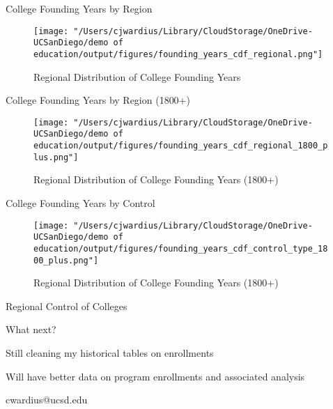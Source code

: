 \documentclass[notes,11pt, aspectratio=169]{beamer}
\newenvironment{wideitemize}{\itemize\addtolength{\itemsep}{10pt}}{\enditemize}
\begin{document}
\begin{frame}{College Founding Years by Region}
    \begin{figure}
        \centering
        \texttt{[image: "/Users/cjwardius/Library/CloudStorage/OneDrive-UCSanDiego/demo of education/output/figures/founding\_years\_cdf\_regional.png"]}
        \caption{Regional Distribution of College Founding Years}
    \end{figure}
\end{frame}

\begin{frame}{College Founding Years by Region (1800+)}
    \begin{figure}
        \centering
        \texttt{[image: "/Users/cjwardius/Library/CloudStorage/OneDrive-UCSanDiego/demo of education/output/figures/founding\_years\_cdf\_regional\_1800\_plus.png"]}
        \caption{Regional Distribution of College Founding Years (1800+)}
    \end{figure}
\end{frame}

\begin{frame}{College Founding Years by Control}
    \begin{figure}
        \centering
        \texttt{[image: "/Users/cjwardius/Library/CloudStorage/OneDrive-UCSanDiego/demo of education/output/figures/founding\_years\_cdf\_control\_type\_1800\_plus.png"]}
        \caption{Regional Distribution of College Founding Years (1800+)}
    \end{figure}
\end{frame}


\begin{frame}{Regional Control of Colleges}
    
\end{frame}


\begin{frame}{What next?}
  \begin{wideitemize}
    \item Still cleaning my historical tables on enrollments
    \item Will have better data on program enrollments and associated analysis 
  \end{wideitemize}
\end{frame}

\begin{frame}{}
\centering cwardius@ucsd.edu
\end{frame}
\end{document}
